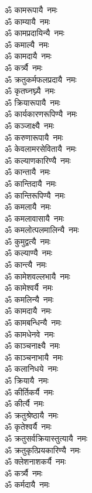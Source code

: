 \begin{flushleft}
\begin{multicols}{2}
ॐ कामरूपायै~नमः\\
ॐ काम्यायै~नमः\\
ॐ कामप्रदायिन्यै~नमः\hfill{}\\
ॐ कमाल्यै~नमः\\
ॐ कामदायै~नमः\\
ॐ कर्त्र्यै~नमः\\
ॐ क्रतुकर्मफलप्रदायै~नमः\\
ॐ कृतघ्नघ्न्यै~नमः\\
ॐ क्रियारूपायै~नमः\\
ॐ कार्यकारणरूपिण्यै~नमः\\
ॐ कञ्जाक्ष्यै~नमः\\
ॐ करुणारूपायै~नमः\\
ॐ केवलामरसेवितायै~नमः\hfill{}\\
ॐ कल्याणकारिण्यै~नमः\\
ॐ कान्तायै~नमः\\
ॐ कान्तिदायै~नमः\\
ॐ कान्तिरूपिण्यै~नमः\\
ॐ कमलायै~नमः\\
ॐ कमलावासायै~नमः\\
ॐ कमलोत्पलमालिन्यै~नमः\\
ॐ कुमुद्वत्यै~नमः\\
ॐ कल्याण्यै~नमः\\
ॐ कान्त्यै~नमः\hfill{}\\
ॐ कामेशवल्लभायै~नमः\\
ॐ कामेश्वर्यै~नमः\\
ॐ कमलिन्यै~नमः\\
ॐ कामदायै~नमः\\
ॐ कामबन्धिन्यै~नमः\\
ॐ कामधेनवे~नमः\\
ॐ काञ्चनाक्ष्यै~नमः\\
ॐ काञ्चनाभायै~नमः\\
ॐ कलानिधये~नमः\\
ॐ क्रियायै~नमः\hfill{}\\
ॐ कीर्तिकर्यै~नमः\\
ॐ कीर्त्यै~नमः\\
ॐ क्रतुश्रेष्ठायै~नमः\\
ॐ कृतेश्वर्यै~नमः\\
ॐ क्रतुसर्वक्रियास्तुत्यायै~नमः\\
ॐ क्रतुकृत्प्रियकारिण्यै~नमः\\
ॐ क्लेशनाशकर्यै~नमः\\
ॐ कर्त्र्यै~नमः\\
ॐ कर्मदायै~नमः\\

\end{multicols}
\end{flushleft}

